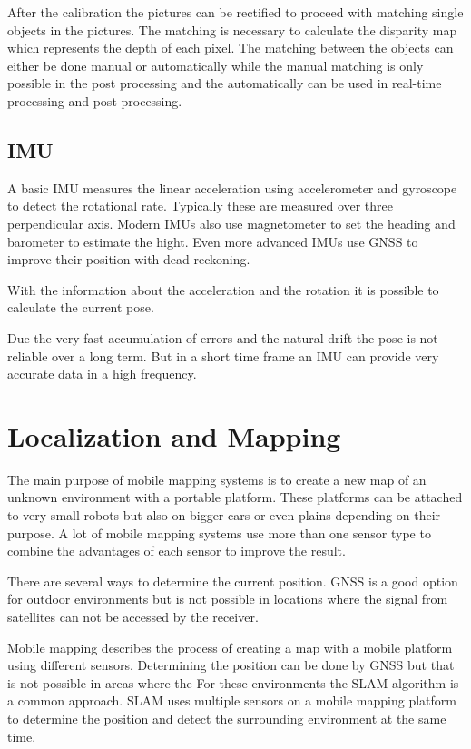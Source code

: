 After the calibration the pictures can be rectified to proceed with matching single objects in the pictures.
The matching is necessary to calculate the disparity map which represents the depth of each pixel.
The matching between the objects can either be done manual or automatically while the manual matching is only possible in the post processing and the automatically can be used in real-time processing and post processing.

\subsection{IMU}\label{ssec:imu}

A basic \ac{IMU} measures the linear acceleration using accelerometer and gyroscope to detect the rotational rate.
Typically these are measured over three perpendicular axis.
Modern \ac{IMU}s also use magnetometer to set the heading and barometer to estimate the hight.
Even more advanced \ac{IMU}s use \ac{GNSS} to improve their position with dead reckoning.

With the information about the acceleration and the rotation it is possible to calculate the current pose. 

Due the very fast accumulation of errors and the natural drift the pose is not reliable over a long term.
But in a short time frame an \ac{IMU} can provide very accurate data in a high frequency. 

\section{Localization and Mapping}\label{sec:localizationAndMapping}

The main purpose of mobile mapping systems is to create a new map of an unknown environment with a portable platform.
These platforms can be attached to very small robots but also on bigger cars or even plains depending on their purpose.
A lot of mobile mapping systems use more than one sensor type to combine the advantages of each sensor to improve the result.

There are several ways to determine the current position.
\ac{GNSS} is a good option for outdoor environments but is not possible in locations where the signal from satellites can not be accessed by the receiver.

Mobile mapping describes the process of creating a map with a mobile platform using different sensors.
Determining the position can be done by \ac{GNSS} but that is not possible in areas where the
For these environments the \ac{SLAM} algorithm is a common approach.
\ac{SLAM} uses multiple sensors on a mobile mapping platform to determine the position and detect the surrounding environment at the same time.


